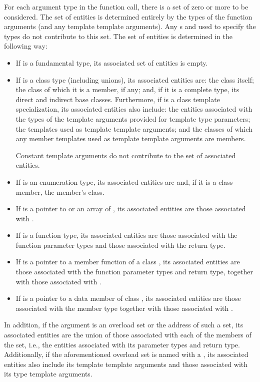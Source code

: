 \pnum
For each argument type  in the function call,
there is a set of zero or more 
to be considered.
The set of entities is determined entirely by
the types of the function arguments
(and any template template arguments).
Any s and 
used to specify the types
do not contribute to this set.
The set of entities
is determined in the following way:
\begin{itemize}
\item If  is a fundamental type, its associated set of
entities is empty.

\item If  is a class type (including unions),
its associated entities are:
the class itself;
the class of which it is a member, if any;
and, if it is a complete type, its direct and indirect base classes.
Furthermore, if  is a class template specialization,
its associated entities also include:
the entities
associated with the types of the template arguments
provided for template type parameters;
the templates used as template template arguments; and
the classes of which any member templates used as template template
arguments are members.
\begin{note}
Constant template arguments do not
contribute to the set of associated entities.
\end{note}

\item If  is an enumeration type,
its associated entities are 
and, if it is a class member, the member's class.

\item If  is a pointer to  or an array of ,
its associated entities are those associated with .

\item If  is a function type, its associated
entities are those associated with the function parameter types and those
associated with the return type.

\item If  is a pointer to a member function of a class
, its associated entities are those associated
with the function parameter types and return type, together with those
associated with .

\item If  is a pointer to a data member of class , its
associated entities are those associated with the member
type together with those associated with .
\end{itemize}
In addition, if the argument is an overload set or the address of such a set,
its associated entities
are the union of those associated with each of the
members of the set, i.e., the entities associated with its
parameter types and return type.
Additionally, if the aforementioned overload set is named with
a , its associated entities also include
its template template arguments and
those associated with its type template arguments.

